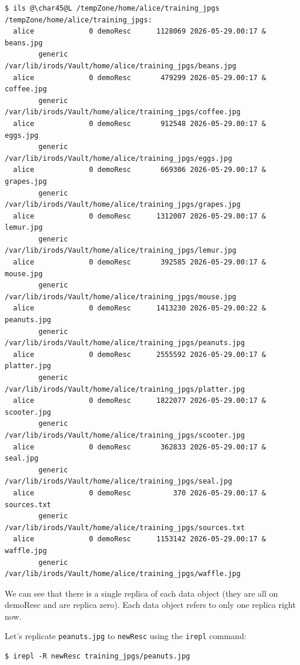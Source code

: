 \documentclass[10pt,oneside]{memoir}
\begin{document}
\begin{lstlisting}[basicstyle=\tiny\ttfamily]
$ ils @\char45@L /tempZone/home/alice/training_jpgs
/tempZone/home/alice/training_jpgs:
  alice             0 demoResc      1128069 2026-05-29.00:17 & beans.jpg
        generic    /var/lib/irods/Vault/home/alice/training_jpgs/beans.jpg
  alice             0 demoResc       479299 2026-05-29.00:17 & coffee.jpg
        generic    /var/lib/irods/Vault/home/alice/training_jpgs/coffee.jpg
  alice             0 demoResc       912548 2026-05-29.00:17 & eggs.jpg
        generic    /var/lib/irods/Vault/home/alice/training_jpgs/eggs.jpg
  alice             0 demoResc       669306 2026-05-29.00:17 & grapes.jpg
        generic    /var/lib/irods/Vault/home/alice/training_jpgs/grapes.jpg
  alice             0 demoResc      1312007 2026-05-29.00:17 & lemur.jpg
        generic    /var/lib/irods/Vault/home/alice/training_jpgs/lemur.jpg
  alice             0 demoResc       392585 2026-05-29.00:17 & mouse.jpg
        generic    /var/lib/irods/Vault/home/alice/training_jpgs/mouse.jpg
  alice             0 demoResc      1413230 2026-05-29.00:22 & peanuts.jpg
        generic    /var/lib/irods/Vault/home/alice/training_jpgs/peanuts.jpg
  alice             0 demoResc      2555592 2026-05-29.00:17 & platter.jpg
        generic    /var/lib/irods/Vault/home/alice/training_jpgs/platter.jpg
  alice             0 demoResc      1822077 2026-05-29.00:17 & scooter.jpg
        generic    /var/lib/irods/Vault/home/alice/training_jpgs/scooter.jpg
  alice             0 demoResc       362833 2026-05-29.00:17 & seal.jpg
        generic    /var/lib/irods/Vault/home/alice/training_jpgs/seal.jpg
  alice             0 demoResc          370 2026-05-29.00:17 & sources.txt
        generic    /var/lib/irods/Vault/home/alice/training_jpgs/sources.txt
  alice             0 demoResc      1153142 2026-05-29.00:17 & waffle.jpg
        generic    /var/lib/irods/Vault/home/alice/training_jpgs/waffle.jpg
\end{lstlisting}

We can see that there is a single replica of each data object (they are all on demoResc and are replica zero). Each data object refers to only one replica right now.

Let's replicate \texttt{peanuts.jpg} to \texttt{newResc} using the \texttt{irepl} command:

\begin{lstlisting}
$ irepl -R newResc training_jpgs/peanuts.jpg
\end{lstlisting}
\end{document}
